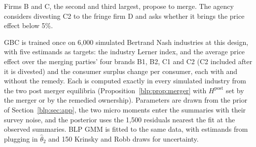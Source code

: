 Firms B and C, the second and third largest, propose to merge. The agency considers divesting C2 to the fringe firm D and asks whether it brings the price effect below 5\%.

GBC is trained once on 6{,}000 simulated Bertrand Nash industries at this
design, with five estimands as targets: the industry Lerner index, and the average price effect over the merging parties' four brands B1, B2, C1 and C2 (C2 included after it is divested) and the consumer surplus change per consumer, each with and without the remedy. Each is computed exactly in every simulated industry from the two post merger equilibria (Proposition~\ref{blp:prop:merger} with $H^{\mathrm{post}}$ set by the merger or by the
remedied ownership). Parameters are drawn from the prior of Section~\ref{blp:sec:app}, the two micro moments enter the summaries with their survey noise, and the posterior uses the 1{,}500 residuals nearest the fit at the observed summaries. BLP GMM is fitted to the same data, with estimands from plugging in $\hat\theta_2$ and 150 Krinsky and Robb draws for uncertainty.

\begin{table}[htbp]
\centering\small
{}
\caption{The cereal case: merging parties' average price effect and consumer surplus change, with
and without the remedy.}
\label{blp:tab:cereal}
\end{table}

